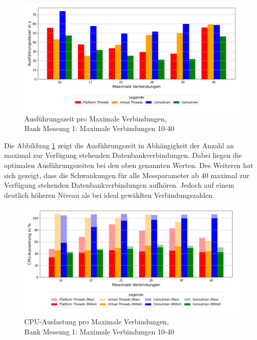 \documentclass[fontsize=12pt,paper=a4,twoside=semi,parskip=half-,headsepline,headinclude]{scrreprt}
\begin{document}
\begin{figure}[H]
	\centering
	\includegraphics[scale=0.5]{figures/bank/connections10-40/execution_time_plot.png}
	\caption{Ausführungszeit pro Maximale Verbindungen,\\ Bank Messung 1: Maximale Verbindungen 10-40}
	\label{fig:bankConnZeit}
\end{figure}

Die Abbildung \ref{fig:bankConnZeit} zeigt die Ausführungszeit in Abhängigkeit der Anzahl an maximal zur Verfügung stehenden Datenbankverbindungen. Dabei liegen die optimalen Ausführungszeiten bei den oben genannten Werten. Des Weiteren hat sich gezeigt, dass die Schwankungen für alle Messparameter ab 40 maximal zur Verfügung stehenden Datenbankverbindungen aufhören. Jedoch auf einem deutlich höheren Niveau als bei ideal gewählten Verbindungszahlen.

\begin{figure}[H]
	\centering
	\includegraphics[scale=0.5]{figures/bank/connections10-40/cpu_usage_bar_plot.png}
	\caption{CPU-Auslastung pro Maximale Verbindungen,\\ Bank Messung 1: Maximale Verbindungen 10-40}
	\label{fig:bankConnCPU}
\end{figure}
\end{document}
